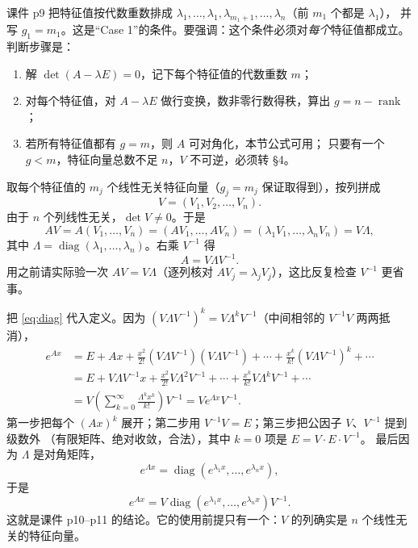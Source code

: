 \documentclass[11pt]{ctexart}
\newcommand{\Ax}{Ax}
\begin{document}
课件 p9 把特征值按代数重数排成
$\lambda_1,\dots,\lambda_1,\lambda_{m_1+1},\dots,\lambda_n$（前 $m_1$ 个都是 $\lambda_1$），
并写 $g_1=m_1$。这是“Case 1”的条件。要强调：这个条件必须对\emph{每个}特征值都成立。
判断步骤是：
\begin{enumerate}
  \item 解 $\det(A-\lambda E)=0$，记下每个特征值的代数重数 $m$；
  \item 对每个特征值，对 $A-\lambda E$ 做行变换，数非零行数得秩，算出 $g=n-\operatorname{rank}$；
  \item 若所有特征值都有 $g=m$，则 $A$ 可对角化，本节公式可用；
        只要有一个 $g<m$，特征向量总数不足 $n$，$V$ 不可逆，必须转 §4。
\end{enumerate}


取每个特征值的 $m_j$ 个线性无关特征向量（$g_j=m_j$ 保证取得到），按列拼成
\[
V=(V_1,V_2,\dots,V_n).
\]
由于 $n$ 个列线性无关，$\det V\ne0$。于是
\[
AV=A(V_1,\dots,V_n)=(AV_1,\dots,AV_n)=(\lambda_1V_1,\dots,\lambda_nV_n)=V\Lambda,
\]
其中 $\Lambda=\operatorname{diag}(\lambda_1,\dots,\lambda_n)$。右乘 $V^{-1}$ 得
\begin{equation}\label{eq:diag}
A=V\Lambda V^{-1}.
\end{equation}
用之前请实际验一次 $AV=V\Lambda$（逐列核对 $AV_j=\lambda_jV_j$），这比反复检查 $V^{-1}$ 更省事。


把 \eqref{eq:diag} 代入定义。因为 $(V\Lambda V^{-1})^k=V\Lambda^kV^{-1}$（中间相邻的
$V^{-1}V$ 两两抵消），
\[
\begin{aligned}
e^{Ax}
&=E+Ax+\frac{x^2}{2!}(V\Lambda V^{-1})(V\Lambda V^{-1})+\cdots
+\frac{x^k}{k!}(V\Lambda V^{-1})^k+\cdots\\
&=E+V\Lambda V^{-1}x+\frac{x^2}{2!}V\Lambda^2V^{-1}+\cdots
+\frac{x^k}{k!}V\Lambda^kV^{-1}+\cdots\\
&=V\left(\sum_{k=0}^{\infty}\frac{\Lambda^kx^k}{k!}\right)V^{-1}
=Ve^{\Lambda x}V^{-1}.
\end{aligned}
\]
第一步把每个 $(\Ax)^k$ 展开；第二步用 $V^{-1}V=E$；第三步把公因子 $V$、$V^{-1}$ 提到级数外
（有限矩阵、绝对收敛，合法），其中 $k=0$ 项是 $E=V\cdot E\cdot V^{-1}$。
最后因为 $\Lambda$ 是对角矩阵，
\[
e^{\Lambda x}=\operatorname{diag}\left(e^{\lambda_1x},\dots,e^{\lambda_nx}\right),
\]
于是
\begin{equation}\label{eq:diagExp}
e^{Ax}=V\operatorname{diag}\left(e^{\lambda_1x},\dots,e^{\lambda_nx}\right)V^{-1}.
\end{equation}
这就是课件 p10--p11 的结论。它的使用前提只有一个：$V$ 的列确实是 $n$ 个线性无关的特征向量。
\end{document}
